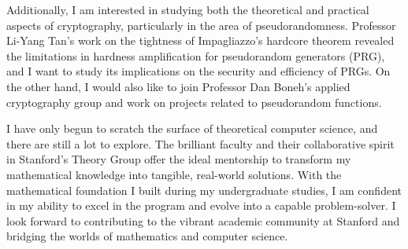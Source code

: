 \documentclass[12pt]{article}
\begin{document}
Additionally, I am interested in studying both the theoretical and practical aspects of cryptography,
particularly in the area of pseudorandomness. Professor Li-Yang Tan's work on the tightness of
Impagliazzo's hardcore theorem \cite{blanc2024samplecomplexitysmoothboosting} revealed the
limitations in hardness amplification for pseudorandom generators (PRG), and I want to study its
implications on the security and efficiency of PRGs. On the other hand, I would also like to join
Professor Dan Boneh's applied cryptography group and work on projects related to pseudorandom
functions.

I have only begun to scratch the surface of theoretical computer science, and there are still a lot
to explore. The brilliant faculty and their collaborative spirit in Stanford's Theory Group offer
the ideal mentorship to transform my mathematical knowledge into tangible, real-world solutions.
With the mathematical foundation I built during my undergraduate studies, I am confident in my
ability to excel in the program and evolve into a capable problem-solver. I look forward to
contributing to the vibrant academic community at Stanford and bridging the worlds of mathematics
and computer science.

\newpage



\end{document}
